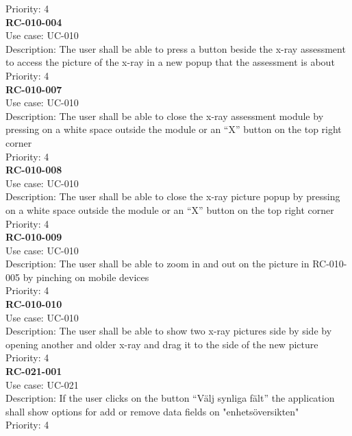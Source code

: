 Priority: 4 \\
\newline
\textbf{RC-010-004} \\
Use case: UC-010 \\
Description: The user shall be able to press a button beside the x-ray assessment to access the picture of the x-ray in a new popup that the assessment is about \\
Priority: 4 \\
\newline
\textbf{RC-010-007} \\
Use case: UC-010 \\
Description: The user shall be able to close the x-ray assessment module by pressing on a white space outside the module or an “X” button on the top right corner \\
Priority: 4 \\
\newline
\textbf{RC-010-008} \\
Use case: UC-010 \\
Description: The user shall be able to close the x-ray picture popup by pressing on a white space outside the module or an “X” button on the top right corner \\
Priority: 4 \\
\newline
\textbf{RC-010-009} \\
Use case: UC-010 \\
Description: The user shall be able to zoom in and out on the picture in RC-010-005 by pinching on mobile devices \\
Priority: 4 \\
\newline
\textbf{RC-010-010} \\
Use case: UC-010 \\
Description: The user shall be able to show two x-ray pictures side by side by opening another and older x-ray and drag it to the side of the new picture \\
Priority: 4 \\
\newline
\textbf{RC-021-001} \\
Use case: UC-021 \\
Description: If the user clicks on the button “Välj synliga fält” the application shall show options for add or remove data fields on "enhetsöversikten"  \\
Priority: 4 \\
\newline
